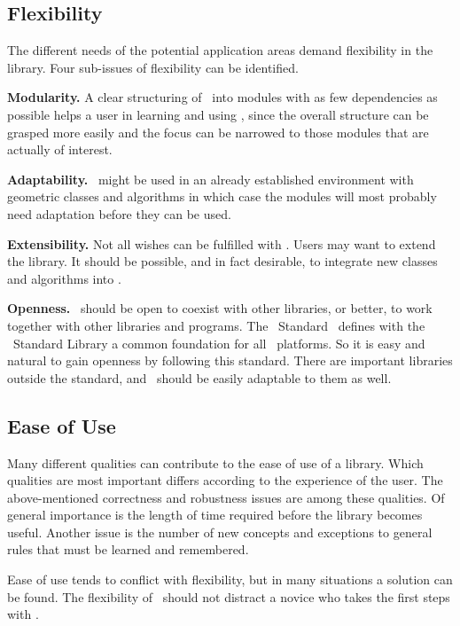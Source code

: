 \subsection*{Flexibility}
The different needs of the potential application areas demand 
flexibility in the library. Four sub-issues of flexibility can be identified.

{\bf Modularity.}
A clear structuring of \cgal\ into modules with as few dependencies as
possible helps a user in learning and using \cgal, since the overall
structure can be grasped more easily and the focus can be narrowed to
those modules that are actually of interest. 

{\bf Adaptability.}
\cgal\ might be used in an already established environment with
geometric classes and algorithms in which case the modules will 
most probably need adaptation before they can be used. 

{\bf Extensibility.}
Not all wishes can be fulfilled with \cgal. Users may want to
extend the library. It should be possible, and in fact desirable, to
integrate new classes and algorithms into \cgal.

{\bf Openness.}
\cgal\ should be open to coexist with other libraries, or better, to
work together with other libraries and programs. The \CC\ 
Standard~\cite{cgal:ansi-is14882-98}
\ccIndexMainItem{\stl}
defines with the \CC\ Standard Library a common
foundation for all \CC\ platforms. 
So it is easy and natural to gain openness by following this standard.
There are important libraries outside the standard, and \cgal\
should be easily adaptable to them as well.

\subsection*{Ease of Use}
Many different qualities can contribute to the ease of use of a
library. Which qualities are most important differs according to 
the experience of the user.
The above-mentioned correctness and robustness issues are among
these qualities. Of general importance is the length of time required
before the library becomes useful. Another issue is the number of 
new concepts and
exceptions to general rules that must be learned and remembered.

Ease of use tends to conflict with flexibility, but in many
situations a solution can be found.
The flexibility of \cgal\ should not distract a novice who takes the 
first steps with \cgal.
\ccIndexSubitem{ease of use}{vs. flexibility}

